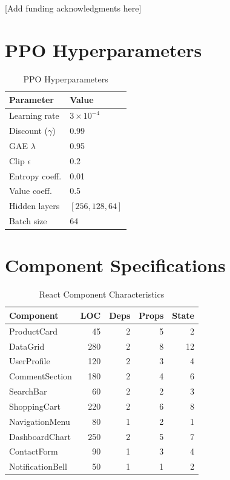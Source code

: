 \documentclass[10pt,twocolumn]{article}
\begin{document}
[Add funding acknowledgments here]




\appendix

\section{PPO Hyperparameters}

\begin{table}[h]
\centering
\caption{PPO Hyperparameters}
\label{tab:ppo}
\small
\begin{tabular}{ll}
\toprule
\textbf{Parameter} & \textbf{Value} \\
\midrule
Learning rate & $3 \times 10^{-4}$ \\
Discount ($\gamma$) & 0.99 \\
GAE $\lambda$ & 0.95 \\
Clip $\epsilon$ & 0.2 \\
Entropy coeff. & 0.01 \\
Value coeff. & 0.5 \\
Hidden layers & $[256, 128, 64]$ \\
Batch size & 64 \\
\bottomrule
\end{tabular}
\end{table}

\section{Component Specifications}

\begin{table}[h]
\centering
\caption{React Component Characteristics}
\label{tab:comp}
\small
\begin{tabular}{lrrrr}
\toprule
\textbf{Component} & \textbf{LOC} & \textbf{Deps} & \textbf{Props} & \textbf{State} \\
\midrule
ProductCard & 45 & 2 & 5 & 2 \\
DataGrid & 280 & 2 & 8 & 12 \\
UserProfile & 120 & 2 & 3 & 4 \\
CommentSection & 180 & 2 & 4 & 6 \\
SearchBar & 60 & 2 & 2 & 3 \\
ShoppingCart & 220 & 2 & 6 & 8 \\
NavigationMenu & 80 & 1 & 2 & 1 \\
DashboardChart & 250 & 2 & 5 & 7 \\
ContactForm & 90 & 1 & 3 & 4 \\
NotificationBell & 50 & 1 & 1 & 2 \\
\bottomrule
\end{tabular}
\end{table}
\end{document}
